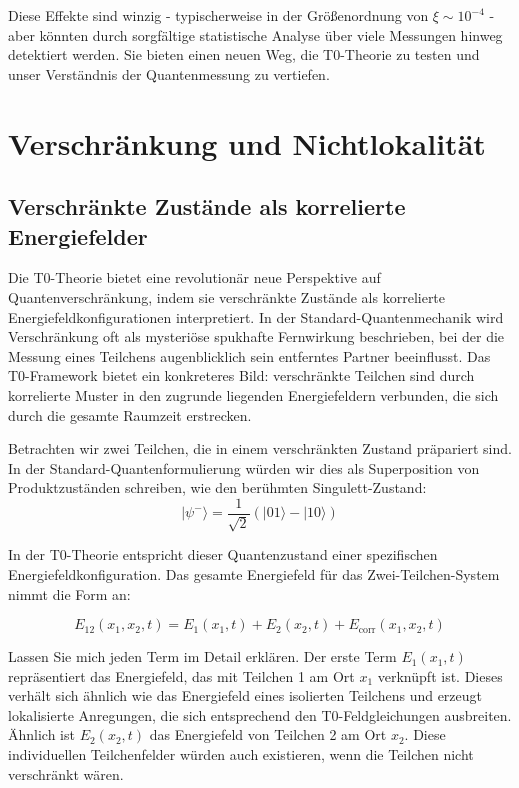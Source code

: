 \documentclass[12pt,a4paper]{article}
\newcommand{\xipar}{\xi}
\theoremstyle{definition}
\theoremstyle{remark}
\begin{document}
Diese Effekte sind winzig - typischerweise in der Gr{\"o}{\ss}enordnung von $\xipar \sim 10^{-4}$ - aber k{\"o}nnten durch sorgf{\"a}ltige statistische Analyse {\"u}ber viele Messungen hinweg detektiert werden. Sie bieten einen neuen Weg, die T0-Theorie zu testen und unser Verst{\"a}ndnis der Quantenmessung zu vertiefen.

\section{Verschr{\"a}nkung und Nichtlokalit{\"a}t}

\subsection{Verschr{\"a}nkte Zust{\"a}nde als korrelierte Energiefelder}

Die T0-Theorie bietet eine revolution{\"a}r neue Perspektive auf Quantenverschr{\"a}nkung, indem sie verschr{\"a}nkte Zust{\"a}nde als korrelierte Energiefeldkonfigurationen interpretiert. In der Standard-Quantenmechanik wird Verschr{\"a}nkung oft als mysteri{\"o}se spukhafte Fernwirkung beschrieben, bei der die Messung eines Teilchens augenblicklich sein entferntes Partner beeinflusst. Das T0-Framework bietet ein konkreteres Bild: verschr{\"a}nkte Teilchen sind durch korrelierte Muster in den zugrunde liegenden Energiefeldern verbunden, die sich durch die gesamte Raumzeit erstrecken.

Betrachten wir zwei Teilchen, die in einem verschr{\"a}nkten Zustand pr{\"a}pariert sind. In der Standard-Quantenformulierung w{\"u}rden wir dies als Superposition von Produktzust{\"a}nden schreiben, wie den ber{\"u}hmten Singulett-Zustand:
$$|\psi^-\rangle = \frac{1}{\sqrt{2}}(|01\rangle - |10\rangle)$$

In der T0-Theorie entspricht dieser Quantenzustand einer spezifischen Energiefeldkonfiguration. Das gesamte Energiefeld f{\"u}r das Zwei-Teilchen-System nimmt die Form an:

\begin{equation}
	E_{12}(x_1,x_2,t) = E_1(x_1,t) + E_2(x_2,t) + E_{\text{corr}}(x_1,x_2,t)
	\label{eq:entangled_energy}
\end{equation}

Lassen Sie mich jeden Term im Detail erkl{\"a}ren. Der erste Term $E_1(x_1,t)$ repr{\"a}sentiert das Energiefeld, das mit Teilchen 1 am Ort $x_1$ verkn{\"u}pft ist. Dieses verh{\"a}lt sich {\"a}hnlich wie das Energiefeld eines isolierten Teilchens und erzeugt lokalisierte Anregungen, die sich entsprechend den T0-Feldgleichungen ausbreiten. {\"A}hnlich ist $E_2(x_2,t)$ das Energiefeld von Teilchen 2 am Ort $x_2$. Diese individuellen Teilchenfelder w{\"u}rden auch existieren, wenn die Teilchen nicht verschr{\"a}nkt w{\"a}ren.
\end{document}
